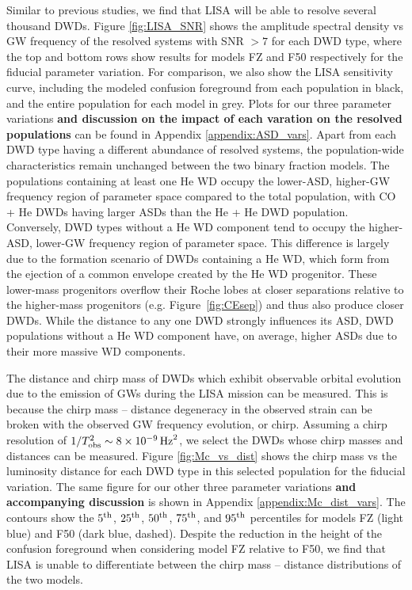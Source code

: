\documentclass[twocolumn, linenumbers]{aastex631}
\begin{document}
Similar to previous studies, we find that LISA will be able to resolve several thousand DWDs. Figure \ref{fig:LISA_SNR} shows the amplitude spectral density vs GW frequency of the resolved systems with SNR $> 7$ for each DWD type, where the top and bottom rows show results for models FZ and F50 respectively for the fiducial parameter variation. For comparison, we also show the LISA sensitivity curve, including the modeled confusion foreground from each population in black, and the entire population for each model in grey. Plots for our three parameter variations \textbf{and discussion on the impact of each varation on the resolved populations} can be found in Appendix \ref{appendix:ASD_vars}. Apart from each DWD type having a different abundance of resolved systems, the population-wide characteristics remain unchanged between the two binary fraction models. The populations containing at least one He WD occupy the lower-ASD, higher-GW frequency region of parameter space compared to the total population, with CO + He DWDs having larger ASDs than the He + He DWD population. Conversely, DWD types without a He WD component tend to occupy the higher-ASD, lower-GW frequency region of parameter space. This difference is largely due to the formation scenario of DWDs containing a He WD, which form from the ejection of a common envelope created by the He WD progenitor. These lower-mass progenitors overflow their Roche lobes at closer separations relative to the higher-mass progenitors (e.g. Figure~\ref{fig:CEsep}) and thus also produce closer DWDs. While the distance to any one DWD strongly influences its ASD, DWD populations without a He WD component have, on average, higher ASDs due to their more massive WD components.


The distance and chirp mass of DWDs which exhibit observable orbital evolution due to the emission of GWs during the LISA mission can be measured. This is because the chirp mass -- distance degeneracy in the observed strain can be broken with the observed GW frequency evolution, or chirp. Assuming a chirp resolution of $1/T_{\rm{obs}}^2 \sim 8\times10^{-9}\,\rm{Hz}^2$, we select the DWDs whose chirp masses and distances can be measured. Figure \ref{fig:Mc_vs_dist} shows the chirp mass vs the luminosity distance for each DWD type in this selected population for the fiducial variation. The same figure for our other three parameter variations \textbf{and accompanying discussion} is shown in Appendix \ref{appendix:Mc_dist_vars}. The contours show the $5^{\rm{th}}$, $25^{\rm{th}}$, $50^{\rm{th}}$, $75^{\rm{th}}$, and $95^{\rm{th}}$ percentiles for models FZ (light blue) and F50 (dark blue, dashed). Despite the reduction in the height of the confusion foreground when considering model FZ relative to F50, we find that LISA is unable to differentiate between the chirp mass -- distance distributions of the two models. 
\end{document}
